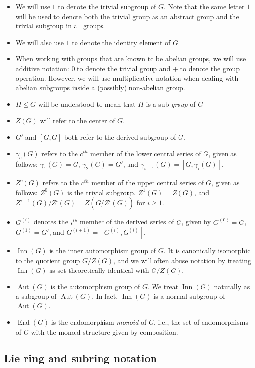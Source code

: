 \begin{itemize}
\item We will use $1$ to denote the trivial subgroup of $G$. Note that
  the same letter $1$ will be used to denote both the trivial group as
  an abstract group and the trivial subgroup in all groups.
\item We will also use $1$ to denote the identity element of $G$.
\item When working with groups that are known to be abelian groups, we
  will use additive notation: $0$ to denote the trivial group and $+$
  to denote the group operation. However, we will use multiplicative
  notation when dealing with abelian subgroups inside a (possibly)
  non-abelian group.
\item $H \le G$ will be understood to mean that $H$ is a sub{\em
  group} of $G$.
\item $Z(G)$ will refer to the center of $G$.
\item $G'$ and $[G,G]$ both refer to the derived subgroup of $G$.
\item $\gamma_c(G)$ refers to the $c^{th}$ member of the lower central
  series of $G$, given as follows: $\gamma_1(G) = G$, $\gamma_2(G) = G'$,
  and $\gamma_{i+1}(G) = [G,\gamma_i(G)]$.
\item $Z^c(G)$ refers to the $c^{th}$ member of the upper central
  series of $G$, given as follows: $Z^0(G)$ is the trivial subgroup,
  $Z^1(G) = Z(G)$, and $Z^{i+1}(G)/Z^i(G) = Z(G/Z^i(G))$ for
  $i \ge 1$.
\item $G^{(i)}$ denotes the $i^{th}$ member of the derived series of
  $G$, given by $G^{(0)} = G$, $G^{(1)} = G'$, and $G^{(i+1)} =
  [G^{(i)},G^{(i)}]$.
\item $\operatorname{Inn}(G)$ is the inner automorphism group of
  $G$. It is canonically isomorphic to the quotient group $G/Z(G)$,
  and we will often abuse notation by treating $\operatorname{Inn}(G)$
  as set-theoretically identical with $G/Z(G)$.
\item $\operatorname{Aut}(G)$ is the automorphism group of $G$. We
  treat $\operatorname{Inn}(G)$ naturally as a subgroup of
  $\operatorname{Aut}(G)$. In fact, $\operatorname{Inn}(G)$ is a
  normal subgroup of $\operatorname{Aut}(G)$.
\item $\operatorname{End}(G)$ is the endomorphism {\em monoid} of $G$,
  i.e., the set of endomorphisms of $G$ with the monoid structure
  given by composition.
\end{itemize}

\subsection{Lie ring and subring notation}\label{sec:lie-ring-notation}

